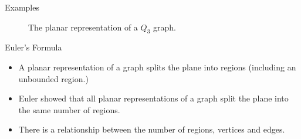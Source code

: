 \documentclass{beamer}
\theoremstyle{definition}
\begin{document}
\begin{frame}{Examples}
    \begin{figure}
        \caption{The planar representation of a $Q_3$ graph.}
    \end{figure}
\end{frame}

\begin{frame}{Euler's Formula}
    \begin{itemize}
        \item A planar representation of a graph splits the plane into regions (including an unbounded region.)
        \item Euler showed that all planar representations of a graph split the plane into the same number of regions.
        \item There is a relationship between the number of regions, vertices and edges.
    \end{itemize}
\end{frame}
\end{document}
